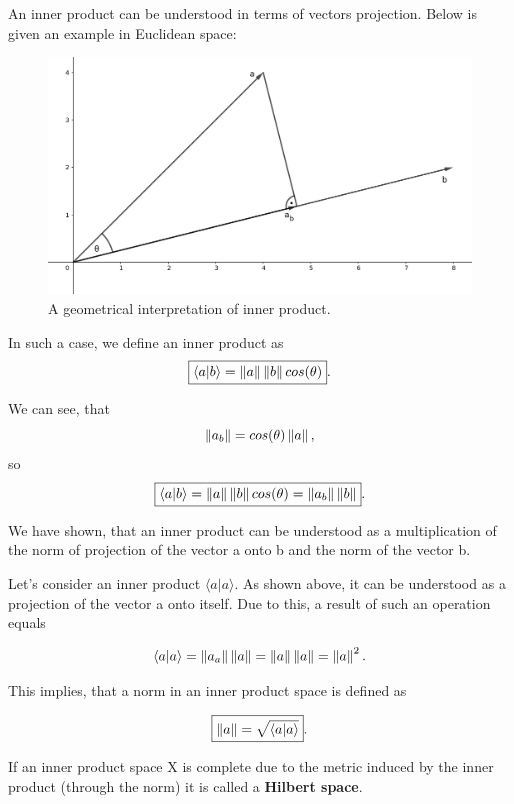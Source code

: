 \begin{remark}
An inner product can be understood in terms of vectors projection. Below is given an example in Euclidean space:


\begin{figure}[ht]
\centering
\includegraphics[scale=0.15]{vectors_projection}
\caption{A geometrical interpretation of inner product.}
\end{figure}

In such a case, we define an inner product as
\[ \boxed{\langle a | b\rangle = \left\lVert a\right\rVert \left\lVert b\right\rVert cos(\theta)}.\]

We can see, that 
\[\left\lVert a_b\right\rVert = cos(\theta) \left\lVert a\right\rVert, \] 
so 
\[ \boxed{\langle a | b\rangle = \left\lVert a\right\rVert \left\lVert b\right\rVert cos(\theta) = \left\lVert a_b\right\rVert \left\lVert b\right\rVert}. \]

We have shown, that an inner product can be understood as a multiplication of the norm of projection of the vector a onto b and the norm of the vector b.

Let's consider an inner product $\langle a | a \rangle$. As shown above, it can be understood as a projection of the vector a onto itself. Due to this, a result of such an operation equals

\[ \langle a | a \rangle = \left\lVert a_a\right\rVert \left\lVert a\right\rVert = \left\lVert a\right\rVert \left\lVert a\right\rVert = \left\lVert a\right\rVert^2.  \]

This implies, that a norm in an inner product space is defined as

\[ \boxed{\left\lVert a\right\rVert = \sqrt{\langle a | a \rangle}}.  \]
\end{remark}

\begin{definition}
If an inner product space X is complete due to the metric induced by the inner product (through the norm) it is called a \textbf{Hilbert space}.
\end{definition}

